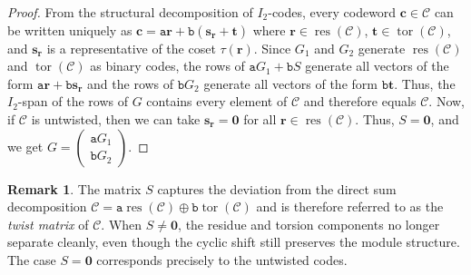 \documentclass[12pt]{article}
\theoremstyle{definition}
\newtheorem{remark}[remark]{Remark}
\theoremstyle{plain}
\begin{document}
\begin{proof}
From the structural decomposition of $I_2$-codes, every codeword $\mathbf{c}\in\mathcal{C}$ can be written uniquely as
$
\mathbf{c} = \mathtt{a} \mathbf{r} + \mathtt{b} ( \mathbf{s}_{\mathbf{r}} + \mathbf{t} )
$
where $\mathbf{r} \in \operatorname{res}(\mathcal{C})$, $\mathbf{t} \in \operatorname{tor} (\mathcal{C})$, and $\mathbf{s}_{\mathbf{r}}$ is a representative of the coset $\tau (\mathbf{r})$.
Since $G_1$ and $G_2$ generate $\operatorname{res}(\mathcal{C})$ and $\operatorname{tor}(\mathcal{C})$ as binary codes, the rows of $\mathtt{a} G_1 + \mathtt{b}S$ generate all vectors of the form $\mathtt{a} \mathbf{r} + \mathtt{b} \mathbf{s}_{\mathbf{r}}$ and the rows of $\mathtt{b}G_2$ generate all vectors of the form $\mathtt{b} \mathbf{t}$.
Thus, the $I_2$-span of the rows of $G$ contains every element of $\mathcal{C}$ and therefore equals $\mathcal{C}$. Now, if $\mathcal{C}$ is untwisted, then we can take $\mathbf{s}_{\mathbf{r}} = \mathbf{0}$ for all $\mathbf{r} \in \operatorname{res} ( \mathcal{C} )$. Thus, $S = \mathbf{0}$, and we get $G = \begin{pmatrix} \mathtt{a}G_1 \\
 \mathtt{b}G_2 \end{pmatrix}$.
\end{proof}





\begin{remark}
The matrix $S$ captures the deviation from the direct sum decomposition $\mathcal{C}=\mathtt{a}\operatorname{res}(\mathcal{C}) \oplus \mathtt{b}\operatorname{tor}(\mathcal{C})$ and is therefore referred to as the \emph{twist matrix} of $\mathcal{C}$.
When $S\neq \mathbf{0}$, the residue and torsion components no longer separate cleanly, even though the cyclic shift still preserves the module structure. The case $S = \mathbf{0}$ corresponds precisely to the untwisted codes.
\end{remark}
\end{document}
